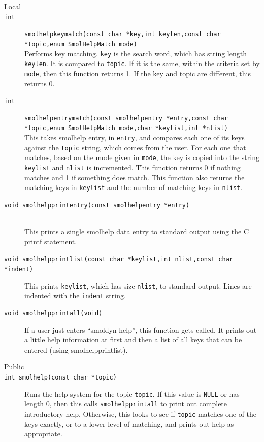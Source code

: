 \documentclass {scrbook}
\newcommand {\ttt} {\texttt}
\begin{document}
\begin{description}

\item[\underline{Local}]

\item[\ttt{int}]
\ttt{smolhelpkeymatch(const char *key,int keylen,const char *topic,enum SmolHelpMatch mode)}
\hfill \\
Performs key matching. \ttt{key} is the search word, which has string length \ttt{keylen}. It is compared to \ttt{topic}. If it is the same, within the criteria set by \ttt{mode}, then this function returns 1. If the key and topic are different, this returns 0.

\item[\ttt{int}]
\ttt{smolhelpentrymatch(const smolhelpentry *entry,const char *topic,enum SmolHelpMatch mode,char *keylist,int *nlist)}
\hfill \\
This takes smolhelp entry, in \ttt{entry}, and compares each one of its keys against the \ttt{topic} string, which comes from the user. For each one that matches, based on the mode given in \ttt{mode}, the key is copied into the string \ttt{keylist} and \ttt{nlist} is incremented. This function returns 0 if nothing matches and 1 if something does match. This function also returns the matching keys in \ttt{keylist} and the number of matching keys in \ttt{nlist}.

\item[\ttt{void smolhelpprintentry(const smolhelpentry *entry)}]
\hfill \\
This prints a single smolhelp data entry to standard output using the C printf statement.

\item[\ttt{void smolhelpprintlist(const char *keylist,int nlist,const char *indent)}]
This prints \ttt{keylist}, which has size \ttt{nlist}, to standard output. Lines are indented with the \ttt{indent} string.

\item[\ttt{void smolhelpprintall(void)}]
If a user just enters ``smoldyn help'', this function gets called. It prints out a little help information at first and then a list of all keys that can be entered (using smolhelpprintlist).

\item[\underline{Public}]

\item[\ttt{int smolhelp(const char *topic)}]
Runs the help system for the topic \ttt{topic}. If this value is \ttt{NULL} or has length 0, then this calls \ttt{smolhelpprintall} to print out complete introductory help. Otherwise, this looks to see if \ttt{topic} matches one of the keys exactly, or to a lower level of matching, and prints out help as appropriate.

\end{description}
\end{document}
